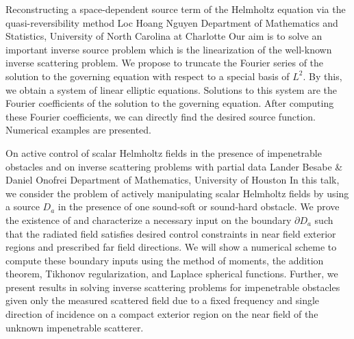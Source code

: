 \vspace{1.5ex}
\abs
{Reconstructing a space-dependent source term of the Helmholtz equation via the quasi-reversibility method}
{Loc Hoang Nguyen}
{Department of Mathematics and Statistics, University of North Carolina at Charlotte}
{Our aim is to solve an important inverse source problem which is the linearization of the well-known inverse scattering problem. We propose to truncate the Fourier series of the solution to the governing equation with respect to a special basis of $L^2$. By this, we obtain a system of linear elliptic equations. Solutions to this system are the Fourier coefficients of the solution to the governing equation. After computing these Fourier coefficients, we can directly find the desired source function. Numerical examples are presented.}


\vspace{1.5ex}
\abs
{On active control of scalar Helmholtz fields in the presence of impenetrable obstacles and on inverse scattering problems with partial data}
{Lander Besabe \& Daniel Onofrei}
{Department of Mathematics, University of Houston}
{In this talk, we consider the problem of actively manipulating scalar Helmholtz fields by using a source $D_a$ in the presence of one sound-soft or sound-hard obstacle. We prove the existence of and characterize a necessary input on the boundary $\partial D_a$ such that the radiated field satisfies desired control constraints in near field exterior regions and prescribed far field directions. We will show a numerical scheme to compute these boundary inputs using the method of moments, the addition theorem, Tikhonov regularization, and Laplace spherical functions. Further, we present results in solving inverse scattering problems for impenetrable obstacles given only the measured scattered field due to a fixed frequency and single direction of incidence on a compact exterior region on the near field of the unknown impenetrable scatterer.}
